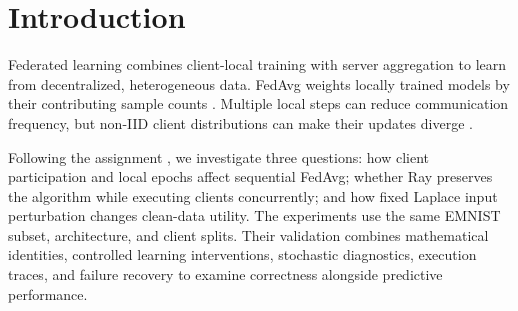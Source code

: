 \section{Introduction}\label{sec:introduction}
Federated learning combines client-local training with server aggregation to learn from decentralized, heterogeneous data. FedAvg weights locally trained models by their contributing sample counts \citep{mcmahan2017}. Multiple local steps can reduce communication frequency, but non-IID client distributions can make their updates diverge \citep{courseFL}.

Following the assignment \citep{assignment}, we investigate three questions: how client participation and local epochs affect sequential FedAvg; whether Ray preserves the algorithm while executing clients concurrently; and how fixed Laplace input perturbation changes clean-data utility. The experiments use the same EMNIST subset, architecture, and client splits. Their validation combines mathematical identities, controlled learning interventions, stochastic diagnostics, execution traces, and failure recovery to examine correctness alongside predictive performance.

